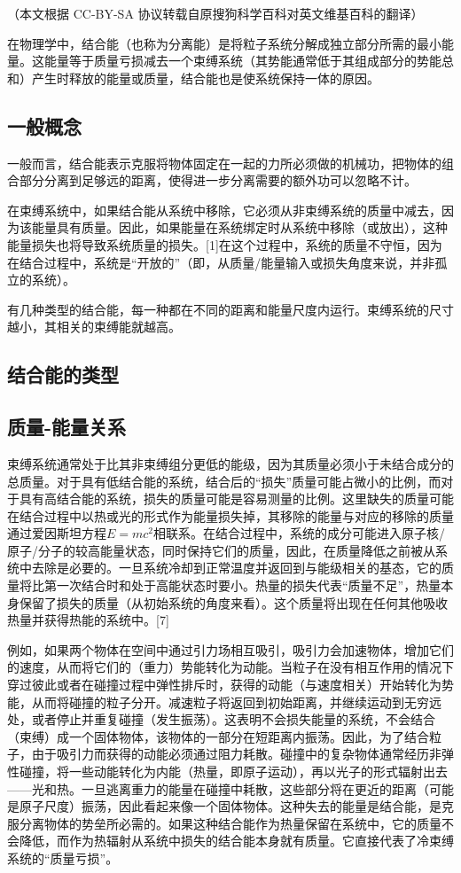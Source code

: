 
（本文根据 CC-BY-SA 协议转载自原搜狗科学百科对英文维基百科的翻译）

在物理学中，结合能（也称为分离能）是将粒子系统分解成独立部分所需的最小能量。这能量等于质量亏损减去一个束缚系统（其势能通常低于其组成部分的势能总和）产生时释放的能量或质量，结合能也是使系统保持一体的原因。

\subsection{一般概念}
一般而言，结合能表示克服将物体固定在一起的力所必须做的机械功，把物体的组合部分分离到足够远的距离，使得进一步分离需要的额外功可以忽略不计。

在束缚系统中，如果结合能从系统中移除，它必须从非束缚系统的质量中减去，因为该能量具有质量。因此，如果能量在系统绑定时从系统中移除（或放出），这种能量损失也将导致系统质量的损失。[1]在这个过程中，系统的质量不守恒，因为在结合过程中，系统是“开放的”（即，从质量/能量输入或损失角度来说，并非孤立的系统）。

有几种类型的结合能，每一种都在不同的距离和能量尺度内运行。束缚系统的尺寸越小，其相关的束缚能就越高。

\subsection{结合能的类型}
\subsection{质量-能量关系}
束缚系统通常处于比其非束缚组分更低的能级，因为其质量必须小于未结合成分的总质量。对于具有低结合能的系统，结合后的“损失”质量可能占微小的比例，而对于具有高结合能的系统，损失的质量可能是容易测量的比例。这里缺失的质量可能在结合过程中以热或光的形式作为能量损失掉，其移除的能量与对应的移除的质量通过爱因斯坦方程$E = mc^2$相联系。在结合过程中，系统的成分可能进入原子核/原子/分子的较高能量状态，同时保持它们的质量，因此，在质量降低之前被从系统中去除是必要的。一旦系统冷却到正常温度并返回到与能级相关的基态，它的质量将比第一次结合时和处于高能状态时要小。热量的损失代表“质量不足”，热量本身保留了损失的质量（从初始系统的角度来看）。这个质量将出现在任何其他吸收热量并获得热能的系统中。[7]

例如，如果两个物体在空间中通过引力场相互吸引，吸引力会加速物体，增加它们的速度，从而将它们的（重力）势能转化为动能。当粒子在没有相互作用的情况下穿过彼此或者在碰撞过程中弹性排斥时，获得的动能（与速度相关）开始转化为势能，从而将碰撞的粒子分开。减速粒子将返回到初始距离，并继续运动到无穷远处，或者停止并重复碰撞（发生振荡）。这表明不会损失能量的系统，不会结合（束缚）成一个固体物体，该物体的一部分在短距离内振荡。因此，为了结合粒子，由于吸引力而获得的动能必须通过阻力耗散。碰撞中的复杂物体通常经历非弹性碰撞，将一些动能转化为内能（热量，即原子运动），再以光子的形式辐射出去——光和热。一旦逃离重力的能量在碰撞中耗散，这些部分将在更近的距离（可能是原子尺度）振荡，因此看起来像一个固体物体。这种失去的能量是结合能，是克服分离物体的势垒所必需的。如果这种结合能作为热量保留在系统中，它的质量不会降低，而作为热辐射从系统中损失的结合能本身就有质量。它直接代表了冷束缚系统的“质量亏损”。

